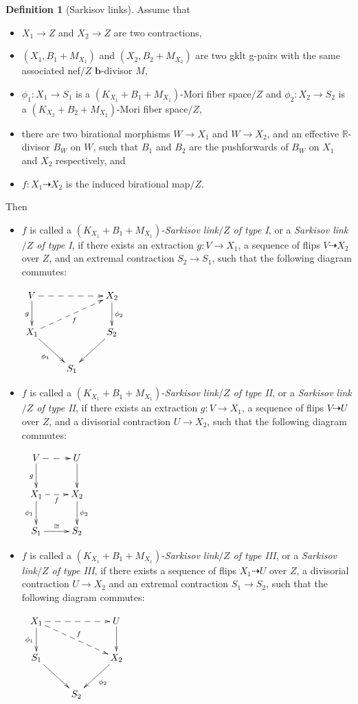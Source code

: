 \documentclass[11pt]{amsart}
\newcommand\wang[1]{\todo[color=blue!40]{#1}}
\numberwithin{equation}{section}
\newcommand{\bb}{\bm{b}}
\newcommand{\Rr}{\mathbb{R}}
\theoremstyle{definition}
\newtheorem{defn}[thm]{Definition}
\theoremstyle{definition}
\theoremstyle{definition}
\begin{document}
\begin{defn}[Sarkisov links]
Assume that
\begin{itemize}
    \item $X_1\rightarrow Z$ and $X_2\rightarrow Z$ are two contractions,
    \item $(X_1,B_1+M_{X_1})$ and $(X_2,B_2+M_{X_2})$ are two gklt g-pairs with the same associated nef$/Z$ $\bb$-divisor $M$,
    \item $\phi_1: X_1\rightarrow S_1$ is a $(K_{X_1}+B_1+M_{X_1})$-Mori fiber space$/Z$ and $\phi_2: X_2\rightarrow S_2$ is a $(K_{X_2}+B_2+M_{X_2})$-Mori fiber space$/Z$, 
    \item there are two birational morphisms $W\rightarrow X_1$ and $W\rightarrow X_2$, and an effective $\Rr$-divisor $B_W$ on $W$, such that $B_1$ and $B_2$ are the pushforwards of $B_W$ on $X_1$ and $X_2$ respectively\wang{Is this necessary?}, and
    \item  $f: X_1\dashrightarrow X_2$ is the induced birational map$/Z$.
\end{itemize}
Then 
\begin{itemize}
    \item $f$ is called a $(K_{X_1}+B_1+M_{X_1})$-\emph{Sarkisov link$/Z$ of type I}, or a \emph{Sarkisov link$/Z$ of type I}, if there exists an extraction $g: V\rightarrow X_1$, a sequence of flips $V\dashrightarrow X_2$ over $Z$, and an extremal contraction $S_2\rightarrow S_1$, such that the following diagram commutes:
    \begin{center}$\xymatrix{
 V\ar@{->}[d]_{g}\ar@{-->}[rr]& &X_2\ar@{->}[d]^{\phi_2} \\
      X_1\ar@{-->}[rru]_{f}\ar@{->}[dr]_{\phi_1}   &  & S_2\ar@{->}[dl] \\
    & S_1 &}$
\end{center}
\item $f$ is called a $(K_{X_1}+B_1+M_{X_1})$-\emph{Sarkisov link$/Z$ of type II}, or a \emph{Sarkisov link$/Z$ of type II}, if there exists an extraction $g: V\rightarrow X_1$, a sequence of flips $V\dashrightarrow U$ over $Z$, and a divisorial contraction $U\rightarrow X_2$, such that the following diagram commutes:
\begin{center}$\xymatrix{
 V\ar@{->}[d]_{g}\ar@{-->}[r]& U\ar@{->}[d] \\
      X_1\ar@{-->}[r]_{f}\ar@{->}[d]_{\phi_1}    & X_2\ar@{->}[d]^{\phi_2} \\
    S_1\ar@{->}[r]^{\cong}& S_2 }$
\end{center}
\item $f$ is called a $(K_{X_1}+B_1+M_{X_1})$-\emph{Sarkisov link$/Z$ of type III}, or a \emph{Sarkisov link$/Z$ of type III}, if there exists a sequence of flips $X_1\dashrightarrow U$ over $Z$, a divisorial contraction $U\rightarrow X_2$ and an extremal contraction $S_1\rightarrow S_2$, such that the following diagram commutes:
\begin{center}$\xymatrix{
 X_1\ar@{->}[d]_{\phi_1}\ar@{-->}[drr]^{f}\ar@{-->}[rr]& &U\ar@{->}[d] \\
      S_1\ar@{->}[dr]   &  & X_2\ar@{->}[dl]^{\phi_2} \\
    & S_2 &}$
\end{center}


\end{itemize}
\end{defn}
\end{document}
